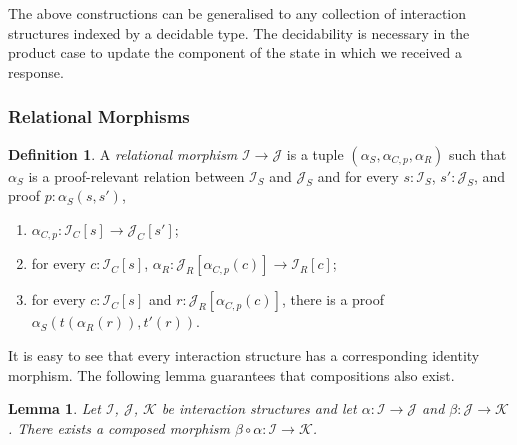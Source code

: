 \documentclass{article}
\newtheorem{lemma}[theorem]{Lemma}
\theoremstyle{definition}
\newtheorem{definition}[theorem]{Definition}
\newcommand{\mc}[1]{\mathcal{#1}}
\newcommand{\iss}[1]{\mathcal{#1}_S}
\newcommand{\isc}[1]{\mathcal{#1}_C}
\newcommand{\isr}[1]{\mathcal{#1}_R}
\begin{document}
    The above constructions can be generalised to any collection of interaction structures indexed by a decidable type.
    The decidability is necessary in the product case to update the component of the state in which we received a
    response.

    \subsubsection{Relational Morphisms}

    \begin{definition}
        A \emph{relational morphism} $\mc I \to \mc J$ is a tuple $(\alpha_S, \alpha_{C, p}, \alpha_R)$
        such that $\alpha_S$ is a proof-relevant relation between $\iss I$ and $\iss J$ and for every $s : \iss I$, $s'
        : \iss J$, and proof $p : \alpha_S(s, s')$,
        \begin{enumerate}
            \item $\alpha_{C, p} : \isc I [s] \to \isc J [s']$;
            \item for every $c : \isc I [s]$, $\alpha_R : \isr J [\alpha_{C, p}(c)] \to \isr I [c]$;
            \item for every $c : \isc I [s]$ and $r : \isr J [\alpha_{C, p}(c)]$, there is a proof $\alpha_S(t(\alpha_R(r)),
                t'(r))$.
        \end{enumerate}
    \end{definition}

    It is easy to see that every interaction structure has a corresponding identity morphism.  The following lemma
    guarantees that compositions also exist.

    \begin{lemma}
        Let $\mathcal{I}$, $\mathcal{J}$, $\mathcal{K}$ be interaction structures and let $\alpha : \mathcal{I} \to
        \mathcal{J}$ and $\beta : \mathcal{J} \to \mathcal{K}$.  There exists a composed morphism $\beta \circ \alpha :
        \mathcal{I} \to \mathcal{K}$.
    \end{lemma}
\end{document}
